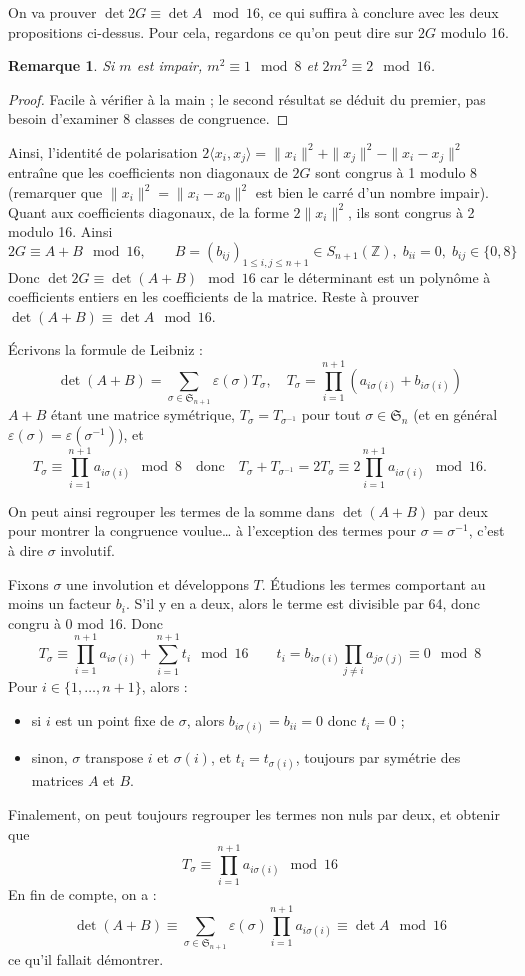 \documentclass[a4paper, 11pt]{article}
\def\Z{\mathbb{Z}}
\def\Sigmap{\mathfrak{S}}
\newtheorem*{remark}{Remarque}
\begin{document}
On va prouver $\det 2G \equiv \det A \mod 16$, ce qui suffira à conclure avec
les deux propositions ci-dessus. Pour cela, regardons ce qu'on peut dire sur
$2G$ modulo 16.

\begin{remark}
  Si $m$ est impair, $m^2 \equiv 1 \mod 8$ et $2m^2 \equiv 2 \mod 16$.
\end{remark}
\begin{proof}
  Facile à vérifier à la main ; le second résultat se déduit du premier, pas
  besoin d'examiner 8 classes de congruence.
\end{proof}

Ainsi, l'identité de polarisation $2 \langle x_i, x_j \rangle = \|x_i\|^2 +
\|x_j\|^2 - \|x_i - x_j\|^2$ entraîne que les coefficients non diagonaux de $2G$
sont congrus à 1 modulo 8 (remarquer que $\|x_i\|^2 = \|x_i - x_0\|^2$ est bien
le carré d'un nombre impair). Quant aux coefficients diagonaux, de la forme
$2\|x_i\|^2$, ils sont congrus à 2 modulo 16. Ainsi
\[ 2G \equiv A + B \mod 16, \qquad B = (b_{ij})_{1 \leq i,j \leq n+1} \in
  S_{n+1}(\Z),\; b_{ii} = 0,\; b_{ij} \in \{0,8\} \]
Donc $\det 2G \equiv \det(A+B) \mod 16$ car le déterminant est un polynôme à
coefficients entiers en les coefficients de la matrice. Reste à prouver
$\det(A+B) \equiv \det A \mod 16$.

Écrivons la formule de Leibniz :
\[ \det(A+B) = \sum_{\sigma \in \Sigmap_{n+1}} \varepsilon(\sigma) T_\sigma,
  \quad T_\sigma = \prod_{i=1}^{n+1} (a_{i \sigma(i)} + b_{i \sigma(i)}) \]
$A+B$ étant une matrice symétrique, $T_\sigma = T_{\sigma^{-1}}$ pour tout
$\sigma \in \Sigmap_n$ (et en général $\varepsilon(\sigma) =
\varepsilon(\sigma^{-1})$), et
\[ T_\sigma \equiv \prod_{i=1}^{n+1} a_{i \sigma(i)} \mod 8 \quad \text{donc}
  \quad T_\sigma + T_{\sigma^{-1}} = 2 T_\sigma \equiv 2 \prod_{i=1}^{n+1} a_{i
    \sigma(i)} \mod 16. \]

On peut ainsi regrouper les termes de la somme dans $\det(A+B)$ par deux pour
montrer la congruence voulue… à l'exception des termes pour $\sigma =
\sigma^{-1}$, c'est à dire $\sigma$ involutif.

Fixons $\sigma$ une involution et développons $T$. Étudions les termes
comportant au moins un facteur $b_i$. S'il y en a deux, alors le terme est
divisible par 64, donc congru à 0 mod 16. Donc
\[ T_\sigma \equiv \prod_{i=1}^{n+1} a_{i \sigma(i)} + \sum_{i=1}^{n+1} t_i
  \mod 16 \qquad t_i = b_{i \sigma(i)} \prod_{j \neq i} a_{j \sigma(j)}
  \equiv 0 \mod 8 \]
Pour $i \in \{1, \ldots, n+1\}$, alors :
\begin{itemize}
\item si $i$ est un point fixe de $\sigma$, alors $b_{i \sigma(i)} = b_{ii} = 0$
  donc $t_i = 0$ ;
\item sinon, $\sigma$ transpose $i$ et $\sigma(i)$, et $t_i = t_{\sigma(i)}$,
  toujours par symétrie des matrices $A$ et $B$.
\end{itemize}
Finalement, on peut toujours regrouper les termes non nuls par deux, et obtenir
que
\[ T_\sigma \equiv \prod_{i=1}^{n+1} a_{i \sigma(i)} \mod 16 \]
En fin de compte, on a :
\[ \det(A+B) \equiv \sum_{\sigma \in \Sigmap_{n+1}} \varepsilon(\sigma)
  \prod_{i=1}^{n+1} a_{i \sigma(i)} \equiv \det A \mod 16 \]
ce qu'il fallait démontrer.
\end{document}
